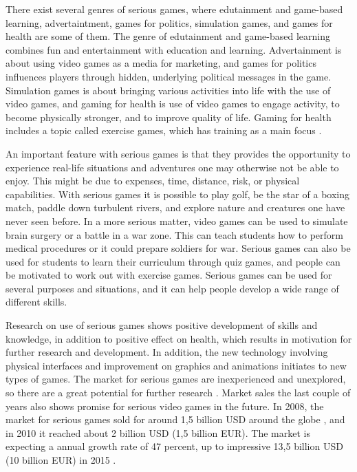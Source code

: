 There exist several genres of serious games, where edutainment and game-based learning, advertaintment, games for politics, simulation games, and games for health are some of them. The genre of edutainment and game-based learning combines fun and entertainment with education and learning. Advertainment is about using video games as a media for marketing, and games for politics influences players through hidden, underlying political messages in the game. Simulation games is about bringing various activities into life with the use of video games, and gaming for health is use of video games to engage activity, to become physically stronger, and to improve quality of life. Gaming for health includes a topic called exercise games, which has training as a main focus \cite{understandingvg} \cite{alfingewang}.

An important feature with serious games is that they provides the opportunity to experience real-life situations and adventures one may otherwise not be able to enjoy. This might be due to expenses, time, distance, risk, or physical capabilities. With serious games it is possible to play golf, be the star of a boxing match, paddle down turbulent rivers, and explore nature and creatures one have never seen before. In a more serious matter, video games can be used to simulate brain surgery or a battle in a war zone. This can teach students how to perform medical procedures or it could prepare soldiers for war. Serious games can also be used for students to learn their curriculum through quiz games, and people can be motivated to work out with exercise games. Serious games can be used for several purposes and situations, and it can help people develop a wide range of different skills. 

Research on use of serious games shows positive development of skills and knowledge, in addition to positive effect on health, which results in motivation for further research and development. In addition, the new technology involving physical interfaces and improvement on graphics and animations initiates to new types of games. The market for serious games are inexperienced and unexplored, so there are a great potential for further research \cite{alfingewang}. Market sales the last couple of years also shows promise for serious video games in the future. In 2008, the market for serious games sold for around 1,5 billion USD around the globe \cite{alfingewang}, and in 2010 it reached about 2 billion USD (1,5 billion EUR). The market is expecting a annual growth rate of 47 percent, up to impressive 13,5 billion USD (10 billion EUR) in 2015 \cite{idate}. 

